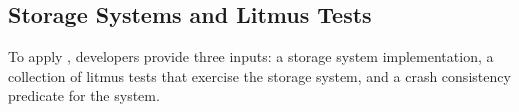 

\subsection{Storage Systems and Litmus Tests}\label{sec:problem:tests}

To apply \depsynth, developers provide three inputs:
a storage system implementation,
a collection of litmus tests that exercise the storage system,
and a crash consistency predicate for the system.

